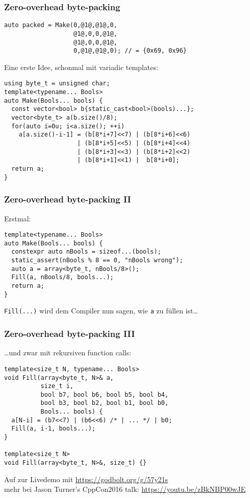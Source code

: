 \documentclass[t,ngerman,usepdftitle=false]{beamer}
\begin{document}
\begin{frame}[fragile]
  \frametitle{Zero-overhead byte-packing}
  \begin{lstlisting}
auto packed = Make(0,@1@,@1@,0,
                   @1@,0,0,@1@,	
                   @1@,0,0,@1@,
                   0,@1@,@1@,0); // = {0x69, 0x96}
  \end{lstlisting}

\pause
Eine erste Idee, schonmal mit variadic templates:
\begin{lstlisting}
using byte_t = unsigned char;
template<typename... Bools>
auto Make(Bools... bools) {
  const vector<bool> b{static_cast<bool>(bools)...};
  vector<byte_t> a(b.size()/8);
  for(auto i=0u; i<a.size(); ++i)
    a[a.size()-i-1] = (b[8*i+7]<<7) | (b[8*i+6]<<6) 
                    | (b[8*i+5]<<5) | (b[8*i+4]<<4) 
                    | (b[8*i+3]<<3) | (b[8*i+2]<<2) 
                    | (b[8*i+1]<<1) |  b[8*i+0];
  return a;
}
\end{lstlisting}
  
\end{frame}

\begin{frame}[fragile]
  \frametitle{Zero-overhead byte-packing II}
  
Erstmal: 
\begin{lstlisting}
template<typename... Bools>
auto Make(Bools... bools) {
  constexpr auto nBools = sizeof...(bools);
  static_assert(nBools % 8 == 0, "nBools wrong");
  auto a = array<byte_t, nBools/8>();
  Fill(a, nBools/8, bools...);
  return a;
}
\end{lstlisting}

\lstinline|Fill(...)| wird dem Compiler nun sagen, wie \lstinline|a| zu füllen ist\ldots

\end{frame}

\begin{frame}[fragile]
  \frametitle{Zero-overhead byte-packing III}

\ldots{}und zwar mit rekursiven function calls:
\begin{lstlisting}
template<size_t N, typename... Bools>
void Fill(array<byte_t, N>& a,
          size_t i,
          bool b7, bool b6, bool b5, bool b4,
          bool b3, bool b2, bool b1, bool b0,
          Bools... bools) {
  a[N-i] = (b7<<7) | (b6<<6) /* | ... */ | b0;
  Fill(a, i-1, bools...);
}

template<size_t N>
void Fill(array<byte_t, N>&, size_t) {}
\end{lstlisting}

\pause
\begin{block}{}
  \centering Auf zur Livedemo mit \url{https://godbolt.org/g/57y21s}\\
  {\small mehr bei Jason Turner's CppCon2016 talk: \url{https://youtu.be/zBkNBP00wJE}}
\end{block}
    
\end{frame}
\end{document}
